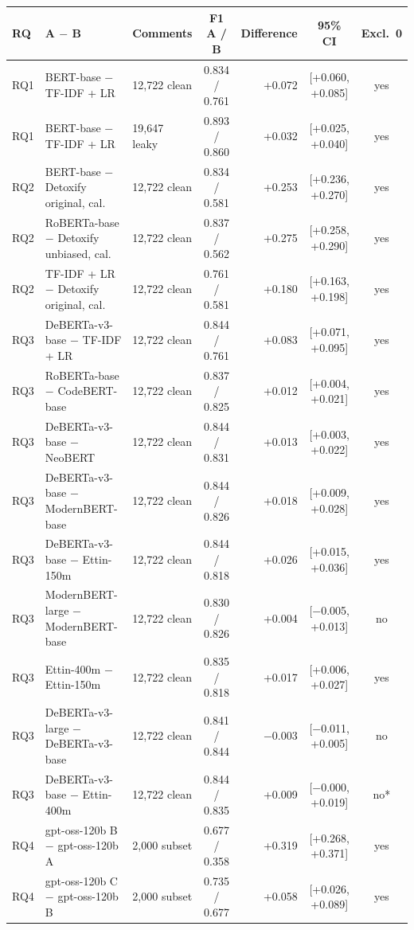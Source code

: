 \begin{tabular}{lllcrcc}
\toprule
RQ & A $-$ B & Comments & F1 A / B & Difference & 95\% CI & Excl.\ 0 \\
\midrule
RQ1 & BERT-base $-$ TF-IDF + LR & 12,722 clean & 0.834 / 0.761 & +0.072 & [+0.060, +0.085] & yes \\
RQ1 & BERT-base $-$ TF-IDF + LR & 19,647 leaky & 0.893 / 0.860 & +0.032 & [+0.025, +0.040] & yes \\
\midrule
RQ2 & BERT-base $-$ Detoxify original, cal. & 12,722 clean & 0.834 / 0.581 & +0.253 & [+0.236, +0.270] & yes \\
RQ2 & RoBERTa-base $-$ Detoxify unbiased, cal. & 12,722 clean & 0.837 / 0.562 & +0.275 & [+0.258, +0.290] & yes \\
RQ2 & TF-IDF + LR $-$ Detoxify original, cal. & 12,722 clean & 0.761 / 0.581 & +0.180 & [+0.163, +0.198] & yes \\
\midrule
RQ3 & DeBERTa-v3-base $-$ TF-IDF + LR & 12,722 clean & 0.844 / 0.761 & +0.083 & [+0.071, +0.095] & yes \\
RQ3 & RoBERTa-base $-$ CodeBERT-base & 12,722 clean & 0.837 / 0.825 & +0.012 & [+0.004, +0.021] & yes \\
RQ3 & DeBERTa-v3-base $-$ NeoBERT & 12,722 clean & 0.844 / 0.831 & +0.013 & [+0.003, +0.022] & yes \\
RQ3 & DeBERTa-v3-base $-$ ModernBERT-base & 12,722 clean & 0.844 / 0.826 & +0.018 & [+0.009, +0.028] & yes \\
RQ3 & DeBERTa-v3-base $-$ Ettin-150m & 12,722 clean & 0.844 / 0.818 & +0.026 & [+0.015, +0.036] & yes \\
RQ3 & ModernBERT-large $-$ ModernBERT-base & 12,722 clean & 0.830 / 0.826 & +0.004 & [$-$0.005, +0.013] & no \\
RQ3 & Ettin-400m $-$ Ettin-150m & 12,722 clean & 0.835 / 0.818 & +0.017 & [+0.006, +0.027] & yes \\
RQ3 & DeBERTa-v3-large $-$ DeBERTa-v3-base & 12,722 clean & 0.841 / 0.844 & $-$0.003 & [$-$0.011, +0.005] & no \\
RQ3 & DeBERTa-v3-base $-$ Ettin-400m & 12,722 clean & 0.844 / 0.835 & +0.009 & [$-$0.000, +0.019] & no* \\
\midrule
RQ4 & gpt-oss-120b B $-$ gpt-oss-120b A & 2,000 subset & 0.677 / 0.358 & +0.319 & [+0.268, +0.371] & yes \\
RQ4 & gpt-oss-120b C $-$ gpt-oss-120b B & 2,000 subset & 0.735 / 0.677 & +0.058 & [+0.026, +0.089] & yes \\

\end{tabular}
